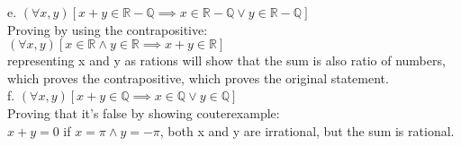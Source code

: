 \documentclass{article}
\begin{document}
e. $(\forall x,y)[x + y \in \mathbb{R-Q} \implies x \in \mathbb{R-Q} \vee y \in \mathbb{R-Q}]$\\
Proving by using the contrapositive:\\
$(\forall x,y)[x \in \mathbb{R} \wedge y \in \mathbb{R} \implies x + y \in \mathbb{R}]$\\
representing x and y as rations will show that the sum is also ratio of numbers, which proves the contrapositive, which proves the original statement.\\

f. $(\forall x,y)[x + y \in \mathbb{Q} \implies x \in \mathbb{Q} \vee y \in \mathbb{Q}]$\\
Proving that it's false by showing couterexample:\\
$x + y = 0$ if $x = \pi \wedge y = -\pi$, both x and y are irrational, but the sum is rational.\\
\end{document}
